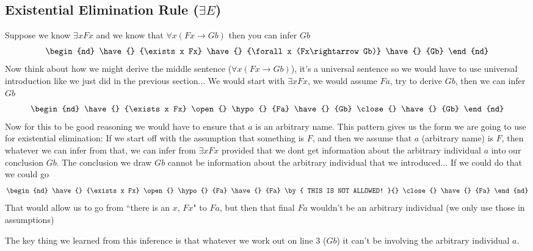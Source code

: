 \subsection{Existential Elimination Rule ($\exists E$)}
Suppose we know $\exists x Fx$ and we know that $\forall x (Fx \rightarrow Gb)$ then you can infer $Gb$
\begin{equation}
    \begin{nd}
        \have{} {\exists x Fx}
        \have{} {\forall x (Fx\rightarrow Gb)}
        \have{} {Gb}
    \end{nd} \nonumber
\end{equation}
Now think about how we might derive the middle sentence ($\forall x (Fx \rightarrow Gb)$), it's a universal sentence so we would have to use universal introduction like we just did in the previous section... We would start with $\exists x Fx$, we would assume $Fa$, try to derive $Gb$, then we can infer $Gb$
\begin{equation}
    \begin{nd}
        \have{} {\exists x Fx}
        \open{}
        \hypo{} {Fa}
        \have{} {Gb}
        \close{}
        \have{} {Gb}
    \end{nd} \nonumber
\end{equation}
Now for this to be good reasoning we would have to ensure that $a$ is an arbitrary name. This pattern gives us the form we are going to use for existential elimination: If we start off with the assumption that something is $F$, and then we assume that $a$ (arbitrary name) is $F$, then whatever we can infer from that, we can infer from $\exists x Fx$ provided that we dont get information about the arbitrary individual $a$ into our conclusion $Gb$. The conclusion we draw $Gb$ cannot be information about the arbitrary individual that we introduced... If we could do that we could go
\begin{equation}
    \begin{nd}
        \have{} {\exists x Fx}
        \open{}
        \hypo{} {Fa}
        \have{} {Fa} \by{ THIS IS NOT ALLOWED! }{}
        \close{}
        \have{} {Fa}
    \end{nd} \nonumber
\end{equation}
That would allow us to go from ``there is an $x$, $Fx$" to $Fa$, but then that final $Fa$ wouldn't be an arbitrary individual (we only use those in assumptions) 

The key thing we learned from this inference is that whatever we work out on line 3 ($Gb$) it can't be involving the arbitrary individual $a$.\\


